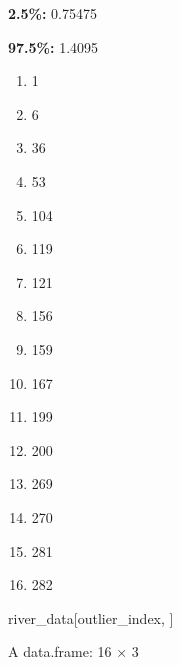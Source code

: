 \documentclass[
  letterpaper,
  DIV=11,
  numbers=noendperiod]{scrreprt}
\newenvironment{Shaded}{\begin{snugshade}}{\end{snugshade}}
\newcommand{\FunctionTok}[1]{\textcolor[rgb]{0.28,0.35,0.67}{#1}}
\newcommand{\NormalTok}[1]{\textcolor[rgb]{0.00,0.23,0.31}{#1}}
\newcommand{\OtherTok}[1]{\textcolor[rgb]{0.00,0.23,0.31}{#1}}
\newcommand{\SpecialCharTok}[1]{\textcolor[rgb]{0.37,0.37,0.37}{#1}}
\providecommand{\tightlist}{%
  \setlength{\itemsep}{0pt}\setlength{\parskip}{0pt}}\usepackage{longtable,booktabs,array}
\begin{document}
\textbf{2.5\%:} 0.75475

\textbf{97.5\%:} 1.4095

\begin{Shaded}
\end{Shaded}

\begin{enumerate}
\def\labelenumi{\arabic{enumi}.}
\tightlist
\item
  1
\item
  6
\item
  36
\item
  53
\item
  104
\item
  119
\item
  121
\item
  156
\item
  159
\item
  167
\item
  199
\item
  200
\item
  269
\item
  270
\item
  281
\item
  282
\end{enumerate}

\begin{Shaded}
\begin{Highlighting}[]
\NormalTok{river\_data[outlier\_index, ]}
\end{Highlighting}
\end{Shaded}

A data.frame: 16 × 3
\end{document}
